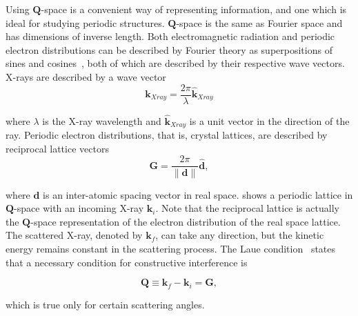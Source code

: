 \documentclass[11pt,twoside]{report}
\begin{document}
\indent Using ${\mathbf Q}$-space is a convenient way of representing information, and one which is ideal for studying periodic structures. ${\mathbf Q}$-space is the same as Fourier space and has dimensions of inverse length. Both electromagnetic radiation and periodic electron distributions can  be described by Fourier theory as superpositions of sines and cosines~\cite{kreyszig}, both of which are described by their respective wave vectors. X-rays are described by a wave vector
\begin{equation}
{\mathbf k}_{Xray} = \frac{2\pi}{\lambda}\widehat{ {\mathbf k}}_{Xray}
\label{eq:k_ray}
\end{equation} 

\noindent where $\lambda$ is the X-ray wavelength and $\widehat{ {\mathbf k}}_{Xray}$ is a unit vector in the direction of the ray. Periodic electron distributions, that is, crystal lattices, are described by reciprocal lattice vectors
\begin{equation}
{\mathbf G} = \frac{2\pi}{\|{\mathbf d}\|}\widehat{{\mathbf d}} ,
\label{eq:k_lattice}
\end{equation} 

\noindent where ${\mathbf d}$ is an inter-atomic spacing vector in real space.   shows a periodic lattice in ${\mathbf Q}$-space with an incoming X-ray ${\mathbf k}_{i}$. Note that the reciprocal lattice is actually the ${\mathbf Q}$-space representation of the electron distribution of the real space lattice. The scattered X-ray, denoted by ${\mathbf k_{f}}$, can take any direction, but the kinetic energy remains constant in the scattering process. The Laue condition~\cite{xrayphys} states that a necessary condition for constructive interference is

\begin{equation}
{\mathbf Q} \equiv {\mathbf k}_{f} - {\mathbf k}_{i} = {\mathbf G} ,
\label{eq:laue}
\end{equation} 

\noindent which is true only for certain scattering angles. 
\end{document}
